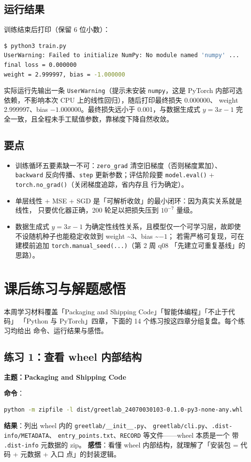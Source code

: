\documentclass{hamesome-report}
\begin{document}
\subsection{运行结果}
训练结束后打印（保留 6 位小数）：
\begin{lstlisting}[language=bash]
$ python3 train.py
UserWarning: Failed to initialize NumPy: No module named 'numpy' ...
final loss = 0.000000
weight = 2.999997, bias = -1.000000
\end{lstlisting}
实际运行先输出一条 \texttt{UserWarning}（提示未安装 \texttt{numpy}，这是 PyTorch
内部可选依赖，不影响本次 CPU 上的线性回归），随后打印最终损失 0.000000、
weight 2.999997、bias $-1.000000$。最终损失远小于 0.001，与数据生成式
$y = 3x - 1$ 完全一致，且全程未手工赋值参数，靠梯度下降自然收敛。

\subsection{要点}
\begin{itemize}
\item 训练循环五要素缺一不可：\texttt{zero\_grad} 清空旧梯度（否则梯度累加）、
  \texttt{backward} 反向传播、\texttt{step} 更新参数；评估阶段要
  \texttt{model.eval()} + \texttt{torch.no\_grad()}（关闭梯度追踪，省内存且
  行为确定）。
\item 单层线性 + MSE + SGD 是「可解析收敛」的最小闭环：因为真实关系就是线性，
  只要优化器正确，200 轮足以把损失压到 $10^{-7}$ 量级。
\item 数据生成式 $y = 3x - 1$ 为确定性线性关系，且模型仅一个可学习层，故即使
不设随机种子也能稳定收敛到 weight \textasciitilde{}3、bias \textasciitilde{}$-1$；
若需严格可复现，可在建模前追加 \texttt{torch.manual\_seed(...)}（第 2 周 q08
「先建立可重复基线」的思路）。
\end{itemize}

\section{课后练习与解题感悟}
本周学习材料覆盖「Packaging and Shipping Code」「智能体编程」「不止于代码」
「Python 与 PyTorch」四章，下面的 14 个练习按这四章分组复盘。每个练习均给出
命令、运行结果与感悟。

\subsection{练习 1：查看 wheel 内部结构}
\textbf{主题：Packaging and Shipping Code}\par
\textbf{命令}：
\begin{lstlisting}[language=bash]
python -m zipfile -l dist/greetlab_24070030103-0.1.0-py3-none-any.whl
\end{lstlisting}
\textbf{结果}：列出 wheel 内的 \texttt{greetlab/\_\_init\_\_.py}、
\texttt{greetlab/cli.py}、\texttt{.dist-info/METADATA}、
\texttt{entry\_points.txt}、\texttt{RECORD} 等文件——wheel 本质是一个
带 \texttt{.dist-info} 元数据的 zip。
\textbf{感悟}：看懂 wheel 内部结构，就理解了「安装包 = 代码 + 元数据 + 入口
点」的封装逻辑。
\end{document}
